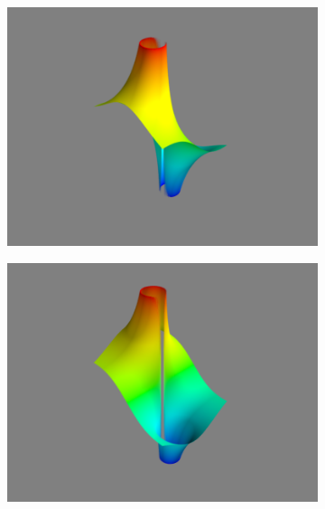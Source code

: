 \begin{figure}
\begin{subfigure}{.32\textwidth}
\includegraphics[width=\textwidth]{inv_real_surface.png}
\end{subfigure}
\begin{subfigure}{.32\textwidth}
\includegraphics[width=\textwidth]{inv_imag_surface.png}
\end{subfigure}
\begin{subfigure}{.32\textwidth}

\end{subfigure}
\end{figure}
